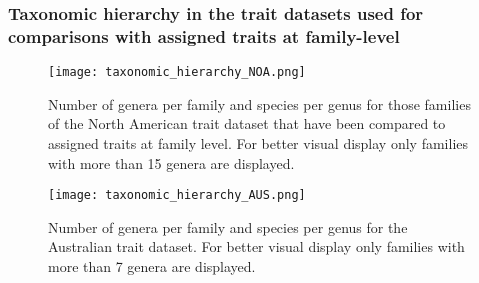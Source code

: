\documentclass[../Draft_harmonization_paper.tex]{subfiles}
\begin{document}
\subsubsection*{Taxonomic hierarchy in the trait datasets used for comparisons with assigned traits at family-level}
\label{sec:taxonomic_hierarchy}

\begin{figure}[H]
    \centering
    \texttt{[image: taxonomic\_hierarchy\_NOA.png]}
    \caption{Number of genera per family and species per genus for those families of the North American trait dataset that have been compared to assigned traits at family level. For better visual display only families with more than 15 genera are displayed.}
    \label{fig:tax_hierarchy_NOA}
\end{figure}

\begin{figure}[H]
    \centering
    \texttt{[image: taxonomic\_hierarchy\_AUS.png]}
    \caption{Number of genera per family and species per genus for the Australian trait dataset. For better visual display only families with more than 7 genera are displayed.}
    \label{fig:tax_hierarchy_AUS}
\end{figure}


\newpage


\end{document}
